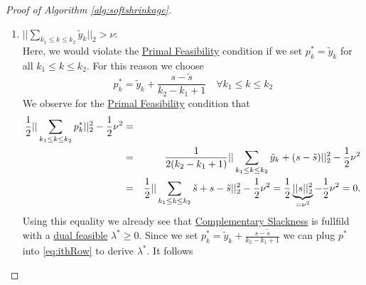 \begin{proof}[Proof of Algorithm \ref{alg:softshrinkage}]
\begin{enumerate}
            \item $||\sum\limits_{k_{1} \le k \le k_{2}} \tilde{y}_{k}||_{2} > \nu$:\\
            Here, we would violate the \underline{Primal Feasibility} condition if we set $p^{\ast}_{k} = \tilde{y}_{k}$ for all $k_{1} \le k \le k_{2}$. For this reason we choose
                $$p^{\ast}_{k} = \tilde{y}_{k} + \frac{s - \tilde{s}}{k_{2} - k_{1} + 1} \,\,\,\,\,\, \forall k_{1} \le k \le k_{2}$$
            We observe for the \underline{Primal Feasibility} condition that
                \begin{eqnarray}
                    \frac{1}{2} ||\sum_{k_{1} \le k \le k_{2}} p^{\ast}_{k}||_{2}^{2} - \frac{1}{2} \nu^{2} &=& \label{eq:caseTwo} \\
                    &=& \frac{1}{2(k_{2} - k_{1} + 1)} ||\sum_{k_{1} \le k \le k_{2}} \tilde{y}_{k} + (s - \tilde{s})||_{2}^{2} - \frac{1}{2} \nu^{2}\notag \\
                    &=& \frac{1}{2} ||\sum_{k_{1} \le k \le k_{2}} \tilde{s} + s - \tilde{s}||_{2}^{2} - \frac{1}{2} \nu^{2} = \frac{1}{2} \underbrace{||s||_{2}^{2}}_{= \nu^{2}} - \frac{1}{2} \nu^{2} = 0. \notag
                \end{eqnarray}
            Using this equality we already see that \underline{Complementary Slackness} is fullfild with a \underline{dual feasible} $\lambda^{\ast} \ge 0$. Since we set $p^{\ast}_{k} = \tilde{y}_{k} + \frac{s - \tilde{s}}{k_{2} - k_{1} + 1}$ we can plug $p^{\ast}$ into \ref{eq:ithRow} to derive $\lambda^{\ast}$. It follows %


\end{enumerate}
\end{proof}
